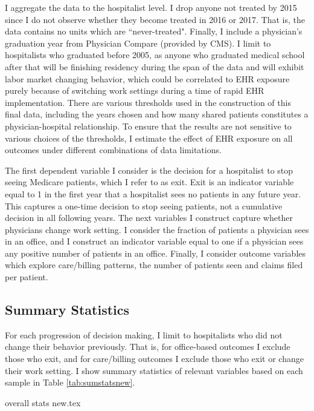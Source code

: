 \documentclass[12pt]{article}
\begin{document}
I aggregate the data to the hospitalist level. I drop anyone not treated by 2015 since I do not observe whether they become treated in 2016 or 2017. That is, the data contains no units which are ``never-treated". Finally, I include a physician's graduation year from Physician Compare (provided by CMS). I limit to hospitalists who graduated before 2005, as anyone who graduated medical school after that will be finishing residency during the span of the data and will exhibit labor market changing behavior, which could be correlated to EHR exposure purely because of switching work settings during a time of rapid EHR implementation. There are various thresholds used in the construction of this final data, including the years chosen and how many shared patients constitutes a physician-hospital relationship. To ensure that the results  are not sensitive to various choices of the thresholds, I estimate the effect of EHR exposure on all outcomes under different combinations of data limitations. 

The first dependent variable I consider is the decision for a hospitalist to stop seeing Medicare patients, which I refer to as exit. Exit is an indicator variable equal to 1 in the first year that a hospitalist sees no patients in any future year. This captures a one-time decision to stop seeing patients, not a cumulative decision in all following years. The next variables I construct capture whether physicians change work setting. I consider the fraction of patients a physician sees in an office, and I construct an indicator variable equal to one if a physician sees any positive number of patients in an office. Finally, I consider outcome variables which explore care/billing patterns, the number of patients seen and claims filed per patient.


\subsection{Summary Statistics}

For each progression of decision making, I limit to hospitalists who did not change their behavior previously. That is, for office-based outcomes I exclude those who exit, and for care/billing outcomes I exclude those who exit or change their work setting. I show summary statistics of relevant variables based on each sample in Table \ref{tab:sumstatsnew}. 

{overall stats new.tex}
\end{document}
